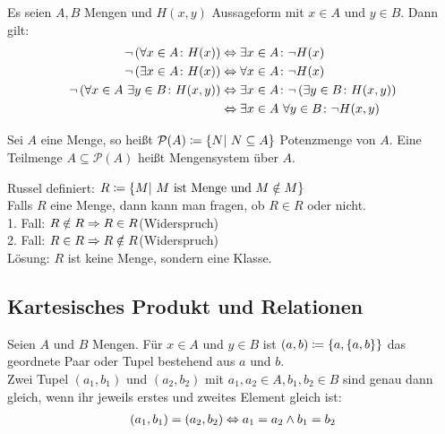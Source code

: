 \begin{folgerung}
    Es seien $A,B$ Mengen und $H(x,y)$ Aussageform mit $x\in A$ und $y \in B$. Dann gilt:
    \begin{align*}
        \neg\left(\forall x \in A\colon H(x)\right) &\Leftrightarrow{} \exists x\in A\colon \neg H(x)\\
        \neg\left(\exists x \in A\colon H(x)\right) &\Leftrightarrow{} \forall x\in A\colon \neg H(x)\\
        \neg \left(\forall x \in A~\exists y\in B\colon H(x,y)\right)&\Leftrightarrow{}\exists x \in A\colon \neg\left(\exists y\in B\colon H(x,y)\right)\\
        &\Leftrightarrow{} \exists x\in A~\forall y \in B\colon \neg H(x,y)\\
    \end{align*}
\end{folgerung}

\begin{definition}
    Sei $A$ eine Menge, so heißt $\mathcal{P}(A) \coloneqq \left\{N|~N \subseteq A\right\}$ Potenzmenge von $A$. Eine Teilmenge $A\subseteq \mathcal{P}(A)$ heißt Mengensystem über $A$.
\end{definition}

\begin{bemerkung}
    Russel definiert: $R\coloneqq\left\{M|~M \text{ ist Menge und $M \notin M$}\right\}$\\
    Falls $R$ eine Menge, dann kann man fragen, ob $R\in R$ oder nicht.\\
    1. Fall: $R\notin R\Rightarrow{} R\in R$\qquad (Widerspruch)\\
    2. Fall: $R\in R\Rightarrow{} R \notin R$\qquad (Widerspruch)\\
    Lösung: $R$ ist keine Menge, sondern eine Klasse.
\end{bemerkung}

\vfill

\subsection{Kartesisches Produkt und Relationen}

\begin{definition}[Tupel]
    Seien $A$ und $B$ Mengen. Für $x\in A$ und $y\in B$ ist $(a,b) \coloneqq \left\{a, \left\{a,b\right\}\right\}$ das geordnete Paar oder Tupel bestehend aus $a$ und $b$.\\[10pt]
    Zwei Tupel $(a_1, b_1)$ und $(a_2, b_2)$ mit $a_1, a_2\in A, b_1, b_2\in B$ sind genau dann gleich, wenn ihr jeweils erstes und zweites Element gleich ist:
    \begin{align*}
    (a_1, b_1)
        = (a_2, b_2) \Leftrightarrow{} a_1 = a_2 \land b_1 = b_2
    \end{align*}
\end{definition}

